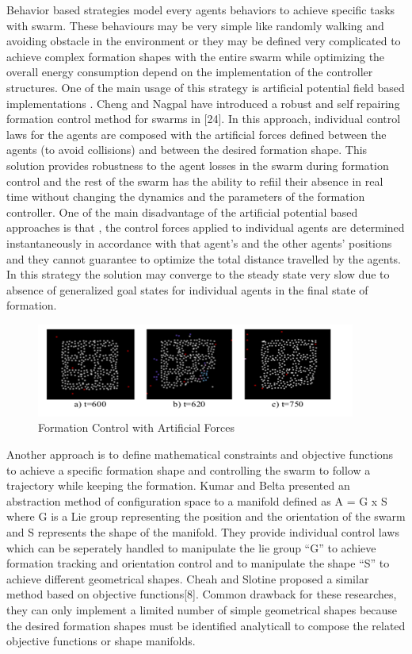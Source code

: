 \documentclass[twoside]{article}
\begin{document}
Behavior based strategies model every agents behaviors to achieve specific tasks with swarm. These behaviours may be very simple like randomly walking and avoiding obstacle in the environment or they may be defined very complicated to achieve complex formation shapes with the entire swarm while optimizing the overall energy consumption depend on the implementation of the controller structures.  One of the main usage of this strategy is artificial potential field based implementations . Cheng and Nagpal have introduced a robust and self repairing formation control method for swarms in [24]. In this approach, individual control laws for the agents are composed with the artificial forces defined between the agents (to avoid collisions) and between the desired formation shape. This solution provides robustness to the agent losses in the swarm during formation control and the rest of the swarm has the ability to refiil their absence in real time without changing the dynamics and the parameters of the formation controller. One of the main disadvantage of the artificial potential based approaches is that , the control forces applied to individual agents are determined instantaneously in accordance with that agent's and the other agents' positions and they cannot guarantee to optimize the total distance travelled by the agents. In this strategy the solution may converge to the steady state very slow due to absence of generalized goal states for individual agents in the final state of formation. 

\begin{figure}[H]
	\caption{Formation Control with Artificial Forces}
	\centering
	\includegraphics[scale = 1]{potential}
\end{figure}


Another approach is to define mathematical constraints and objective functions to achieve a specific formation shape and controlling the swarm to follow a trajectory while keeping the formation.  Kumar and Belta presented an abstraction method of configuration space to a manifold defined as A  = G x S where G is a Lie group representing the position and the orientation of the swarm  and S represents the shape of the manifold.  They provide individual control laws which can be seperately handled to manipulate the lie group “G” to achieve formation tracking and orientation control and to manipulate the shape “S” to achieve different geometrical shapes. Cheah and Slotine proposed a similar method based on objective functions[8].  Common drawback for these researches, they can only implement a limited number of simple geometrical shapes because the desired formation shapes must be identified analyticall to compose the related objective functions or shape manifolds. 
\end{document}
